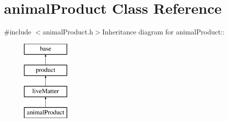 \hypertarget{classanimal_product}{
\section{animalProduct Class Reference}
\label{classanimal_product}
}


{\ttfamily \#include $<$animalProduct.h$>$}Inheritance diagram for animalProduct::\begin{figure}[H]
\begin{center}
\leavevmode
\includegraphics[height=4cm]{classanimal_product}
\end{center}
\end{figure}

